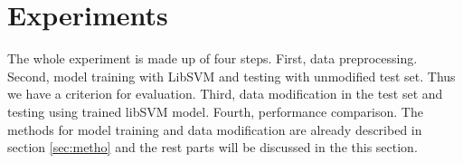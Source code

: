 \documentclass[11pt]{article}
\begin{document}



\section{Experiments}\label{sec:exp}
The whole experiment is made up of four steps. First, data preprocessing. Second, model training with LibSVM and testing with unmodified test set. Thus we have a criterion for evaluation. Third, data modification in the test set and testing using trained libSVM model. Fourth, performance comparison. The methods for model training and data modification are already described in section \ref{sec:metho} and the rest parts will be discussed in the this section.

\end{document}
